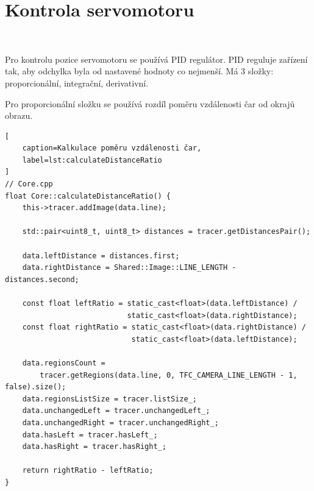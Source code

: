 \section{Kontrola servomotoru}\

Pro kontrolu pozice servomotoru se používá PID regulátor. PID reguluje
zařízení tak, aby odchylka byla od nastavené hodnoty co nejmenší. Má 3 složky: proporcionální, integrační, derivativní\cite{PID}.

Pro proporcionální složku se používá rozdíl poměru vzdálenosti čar od okrajů obrazu.
\begin{lstlisting}[
	caption=Kalkulace poměru vzdálenosti čar,
	label=lst:calculateDistanceRatio
]
// Core.cpp
float Core::calculateDistanceRatio() {
    this->tracer.addImage(data.line);

    std::pair<uint8_t, uint8_t> distances = tracer.getDistancesPair();

    data.leftDistance = distances.first;
    data.rightDistance = Shared::Image::LINE_LENGTH - distances.second;

    const float leftRatio = static_cast<float>(data.leftDistance) /
                            static_cast<float>(data.rightDistance);
    const float rightRatio = static_cast<float>(data.rightDistance) /
                             static_cast<float>(data.leftDistance);

    data.regionsCount =
        tracer.getRegions(data.line, 0, TFC_CAMERA_LINE_LENGTH - 1, false).size();
    data.regionsListSize = tracer.listSize_;
    data.unchangedLeft = tracer.unchangedLeft_;
    data.unchangedRight = tracer.unchangedRight_;
    data.hasLeft = tracer.hasLeft_;
    data.hasRight = tracer.hasRight_;

    return rightRatio - leftRatio;
}
\end{lstlisting}

